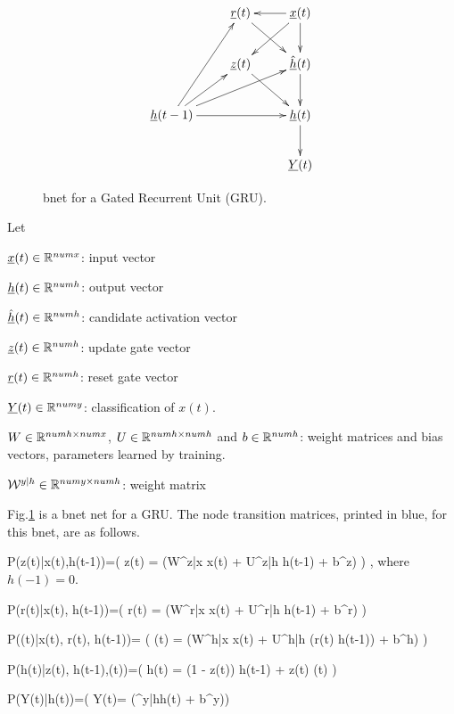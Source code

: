 \begin{figure}[h!]
\centering
$$\xymatrix{
&\rvr(t)\ar[dr]&\rvx(t)\ar[d]\ar[dl]\ar[l]
\\
&\rvz(t)\ar[dr]
&\hat{\rvh}(t)\ar[d]
\\
\rvh(t-1)\ar[ur]\ar[rr]\ar[urr]\ar[uur]
&&\rvh(t)\ar[d]
\\
&&\rvY(t)
}$$
\caption{bnet for a Gated
Recurrent Unit (GRU).}
\label{fig-rnn-gru}
\end{figure}

Let

${\underline{x}}(t)\in { \mathbb{R}}^{numx}$: input vector

${\underline{h}}(t)\in{ \mathbb{R}}^{numh}$: output vector

$\hat{{\underline{h}}}(t)\in{ \mathbb{R}}^{numh}$: candidate activation vector

${\underline{z}}(t)\in{ \mathbb{R}}^{numh}$: update gate vector

${\underline{r}}(t)\in{ \mathbb{R}}^{numh}$: reset gate vector

${\underline{Y}}(t)\in { \mathbb{R}}^{numy}$: 
classification of $x(t)$.

$W\in { \mathbb{R}}^{numh\times numx}$, 
$U\in { \mathbb{R}}^{numh\times numh}$
and 
$b\in { \mathbb{R}}^{numh}$: 
weight matrices and bias vectors,
 parameters learned by training.

${\cal W}^{y|h}\in { \mathbb{R}}^{numy\times numh}$:
 weight matrix

Fig.\ref{fig-rnn-gru}
is a bnet net
for a GRU.
The node transition matrices, printed in blue,
for this bnet, are
as follows.


\beq\color{blue}
P(z(t)|x(t),h(t-1))=\indi(\;\;\;
z(t) = \sigma(W^{z|x} x(t) + U^{z|h} h(t-1) + b^z)
\;\;\;)
\;,
\eeq
where $h(-1)=0$.

\beq\color{blue}
P(r(t)|x(t), h(t-1))=\indi(\;\;\;
r(t) = \sigma(W^{r|x} x(t) + U^{r|h} h(t-1) + b^r)
\;\;\;)
\eeq

\beq\color{blue}
P((t)|x(t), r(t), h(t-1))=
\indi(\;\;\;
(t) = \tanh(W^{h|x} x(t) +
 U^{h|h} (r(t) \odot h(t-1)) + b^h)
\;\;\;)
\eeq

\beq\color{blue}
P(h(t)|z(t), h(t-1),(t))=\indi(\;\;\;
h(t) =  (1 - z(t)) \odot h(t-1) +
 z(t) \odot {}(t)
\;\;\;)
\eeq

\beq\color{blue}
P(Y(t)|h(t))=\indi(\;\;\;
Y(t)= \cala(\calw^{y|h}h(t) + b^y)\;\;\;)
\eeq
